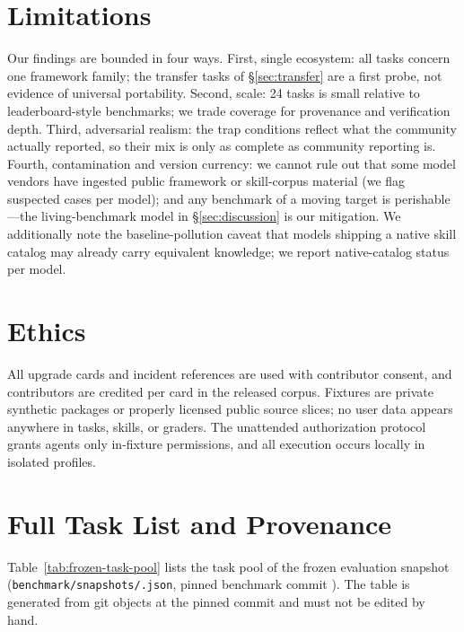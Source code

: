 \documentclass[11pt]{article}
\begin{document}
\section*{Limitations}

Our findings are bounded in four ways.
First, single ecosystem: all tasks concern one framework family; the transfer tasks of \S\ref{sec:transfer} are a first probe, not evidence of universal portability.
Second, scale: 24 tasks is small relative to leaderboard-style benchmarks; we trade coverage for provenance and verification depth.
Third, adversarial realism: the trap conditions reflect what the community actually reported, so their mix is only as complete as community reporting is.
Fourth, contamination and version currency: we cannot rule out that some model vendors have ingested public framework or skill-corpus material (we flag suspected cases per model); and any benchmark of a moving target is perishable---the living-benchmark model in \S\ref{sec:discussion} is our mitigation.
We additionally note the baseline-pollution caveat that models shipping a native skill catalog may already carry equivalent knowledge; we report native-catalog status per model.

\section*{Ethics}

All upgrade cards and incident references are used with contributor consent, and contributors are credited per card in the released corpus.
Fixtures are private synthetic packages or properly licensed public source slices; no user data appears anywhere in tasks, skills, or graders.
The unattended authorization protocol grants agents only in-fixture permissions, and all execution occurs locally in isolated profiles.




\appendix

\section{Full Task List and Provenance}
\label{app:tasklist}
Table~\ref{tab:frozen-task-pool} lists the task pool of the frozen evaluation snapshot (\texttt{benchmark/snapshots/\BenchmarkSnapshotId{}.json}, pinned benchmark commit \texttt{\BenchmarkCommitFull{}}). The table is generated from git objects at the pinned commit and must not be edited by hand.
\end{document}
